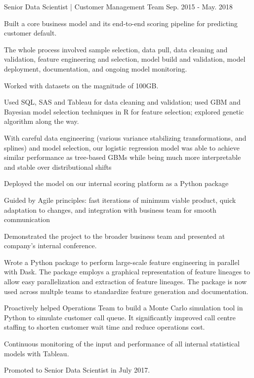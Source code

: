 \begin{cventries}
    \cventry
      {Senior Data Scientist | Customer Management Team} %
      {} %
      {} %
      {Sep. 2015 - May. 2018} %
      {
        \begin{cvitems} %
          \item {Built a core business model and its end-to-end scoring pipeline for predicting customer default.}\\
          \begin{cvitems}
            \item {The whole process involved sample selection, data pull, data cleaning and validation, feature engineering and selection, model build and validation, model deployment, documentation, and ongoing model monitoring.}
            \item {Worked with datasets on the magnitude of 100GB.}
            \item {Used SQL, SAS and Tableau for data cleaning and validation; used GBM and Bayesian model selection techniques in R for feature selection; explored genetic algorithm along the way.}
            \item {With careful data engineering (various variance stabilizing transformations, and splines) and model selection, our logistic regression model was able to achieve similar performance as tree-based GBMs while being much more interpretable and stable over distributional shifts}
            \item {Deployed the model on our internal scoring platform as a Python package}
            \item {Guided by Agile principles: fast iterations of minimum viable product, quick adaptation to changes, and integration with business team for smooth communication}
            \item {Demonstrated the project to the broader business team and presented at company's internal conference.}\\
          \end{cvitems}
          \item {Wrote a Python package to perform large-scale feature engineering in parallel with Dask. The package employs a graphical representation of feature lineages to allow easy parallelization and extraction of feature lineages. The package is now used across multple teams to standardize feature generation and documentation.}
          \item {Proactively helped Operations Team to build a Monte Carlo simulation tool in Python to simulate customer call queue. It significantly improved call centre staffing to shorten customer wait time and reduce operations cost.}
          \item {Continuous monitoring of the input and performance of all internal statistical models with Tableau.}
          \item {Promoted to Senior Data Scientist in July 2017.}
        \end{cvitems}
      }

\end{cventries}

